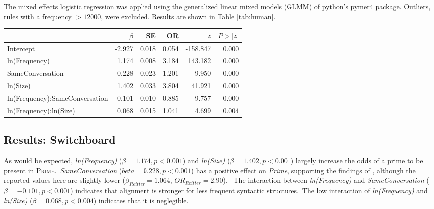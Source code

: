 \documentclass[11pt]{article}
\begin{document}
The mixed effects logistic regression was applied using the generalized linear mixed models (GLMM) of python's pymer4 package. Outliers, rules with a frequency $> 12000$, were excluded. Results are shown in Table \ref{tab:human}.


\begin{table*}
  \centering
  \begin{tabular}{lrrrrr}
    \hline
    &$\beta$&SE&OR& $z$& $P>|z|$\\
    \hline
    Intercept&
    -2.927& 0.018& 0.054&  -158.847& 0.000\\
    
    ln(Frequency)&
    1.174& 0.008& 3.184& 143.182& 0.000\\
    
    SameConversation&
    0.228& 0.023& 1.201& 9.950& 0.000\\
    
    ln(Size)&
    1.402& 0.033& 3.804& 41.921& 0.000\\
    ln(Frequency):SameConversation&
    -0.101& 0.010& 0.885& -9.757& 0.000\\
    ln(Frequency):ln(Size)&
    0.068& 0.015& 1.041& 4.699& 0.004\\
    \hline
    
  \end{tabular}
  \caption{\label{tab:human}
  Results of the GLMM on the samples drawn from the Switchboard Corpus. Fixed effects, except \textit{SameConversation}, are centered. The model with the lowest $AIC$ was taken ($\Delta AIC>6$ compared to the second-best model).}
  
\end{table*}
\subsection{Results: Switchboard}
As would be expected, \textit{ln(Frequency)} ($\beta=1.174, p<0.001$) and \textit{ln(Size)} ($\beta=1.402, p<0.001$) largely increase the odds of a prime to be present in \textsc{Prime}.\
\textit{SameConversation} ($beta=0.228, p<0.001$) has a positive effect on \textit{Prime}, supporting the findings of \citealp{reitter2008context}, although the reported values here are slightly lower ($\beta_{Reitter}=1.064$, $OR_{Reitter} = 2.90$). \
The interaction between \textit{ln(Frequency)} and \textit{SameConversation} ($\beta=-0.101, p<0.001$) indicates that alignment is stronger for less frequent syntactic structures.\
The low interaction of \textit{ln(Frequency)} and \textit{ln(Size)} ($\beta=0.068, p<0.004$) indicates that it is neglegible.
\end{document}
